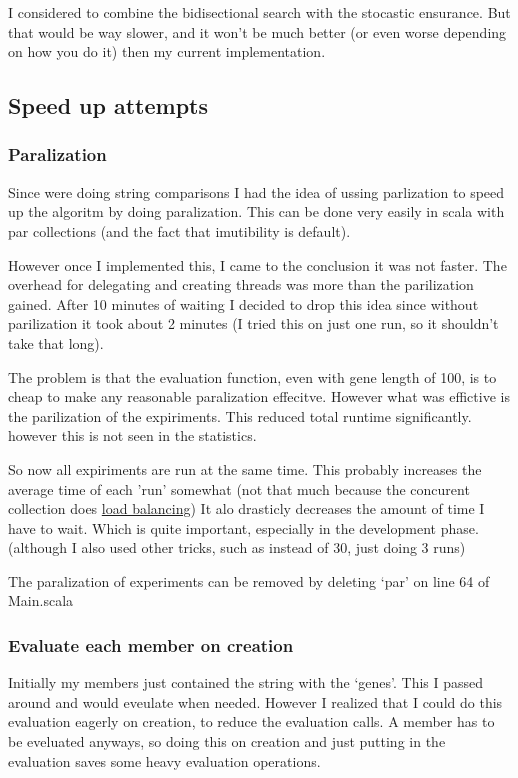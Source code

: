 \documentclass{article}
\begin{document}
I considered to combine the bidisectional search with the stocastic ensurance.
But that would be way slower, and it won't be much better (or even worse depending
on how you do it) then my current implementation.


\subsection{Speed up attempts}
\subsubsection{Paralization}
Since were doing string comparisons I had the idea of ussing parlization to
speed up the algoritm by doing paralization. This can be done very easily
in scala with par collections (and the fact that imutibility is default).

However once I implemented this, I came to the conclusion it was not faster.
The overhead for delegating and creating threads was more than the parilization
gained.  After 10 minutes of waiting I decided to drop this idea 
since without parilization it took about 2 minutes (I tried this
on just one run, so it shouldn't take that long).

The problem is that the evaluation function, even with gene length of 100, is
to cheap to make any reasonable paralization effecitve. However what was effictive
is the parilization of the expiriments. This reduced total runtime 
significantly. however this is not seen in the statistics.

So now all expiriments are run at the same time. This probably increases the
average time of each 'run' somewhat (not that much because the concurent
collection does \href{http://docs.scala-lang.org/overviews/parallel-collections/configuration.html}{load balancing})
It alo drasticly decreases the amount of time I have to wait. Which is quite
important, especially in the development phase. (although I also used
other tricks, such as instead of 30, just doing 3 runs)

The paralization of experiments can be removed by deleting `par' on line 64
of Main.scala

\subsubsection{Evaluate each member on creation}
Initially my members just contained the string with the `genes'. This I passed
around and would eveulate when needed. However I realized that I could do this
evaluation eagerly on creation, to reduce the evaluation calls. A member has
to be eveluated anyways, so doing this on creation and just putting in the
evaluation saves some heavy evaluation operations.
\end{document}
